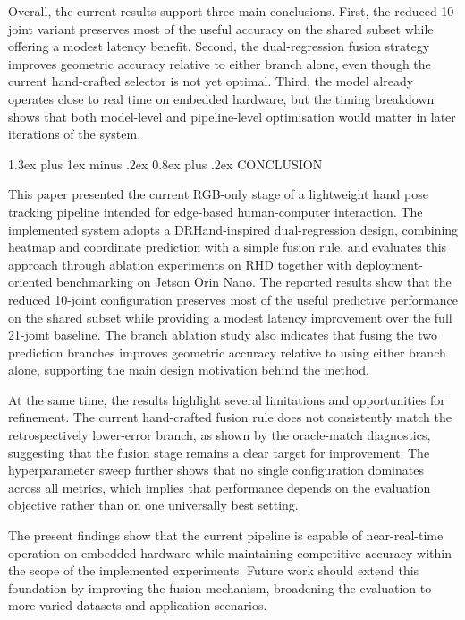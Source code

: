 \documentclass[10pt,letterpaper,twocolumn]{article}
\makeatletter
\renewcommand\section{\@startsection{section}{1}{\z@}%
  {1.3ex plus 1ex minus .2ex}%
  {0.8ex plus .2ex}%
  {\centering\normalfont\small\scshape}}
\makeatother
\begin{document}
Overall, the current results support three main conclusions. First, the reduced 10-joint variant preserves most of the useful accuracy on the shared subset while offering a modest latency benefit. Second, the dual-regression fusion strategy improves geometric accuracy relative to either branch alone, even though the current hand-crafted selector is not yet optimal. Third, the model already operates close to real time on embedded hardware, but the timing breakdown shows that both model-level and pipeline-level optimisation would matter in later iterations of the system.

\section{CONCLUSION}

This paper presented the current RGB-only stage of a lightweight hand pose tracking pipeline intended for edge-based human-computer interaction. The implemented system adopts a DRHand-inspired dual-regression design, combining heatmap and coordinate prediction with a simple fusion rule, and evaluates this approach through ablation experiments on RHD together with deployment-oriented benchmarking on Jetson Orin Nano. The reported results show that the reduced 10-joint configuration preserves most of the useful predictive performance on the shared subset while providing a modest latency improvement over the full 21-joint baseline. The branch ablation study also indicates that fusing the two prediction branches improves geometric accuracy relative to using either branch alone, supporting the main design motivation behind the method.

At the same time, the results highlight several limitations and opportunities for refinement. The current hand-crafted fusion rule does not consistently match the retrospectively lower-error branch, as shown by the oracle-match diagnostics, suggesting that the fusion stage remains a clear target for improvement. The hyperparameter sweep further shows that no single configuration dominates across all metrics, which implies that performance depends on the evaluation objective rather than on one universally best setting.

The present findings show that the current pipeline is capable of near-real-time operation on embedded hardware while maintaining competitive accuracy within the scope of the implemented experiments. Future work should extend this foundation by improving the fusion mechanism, broadening the evaluation to more varied datasets and application scenarios. 
\end{document}

